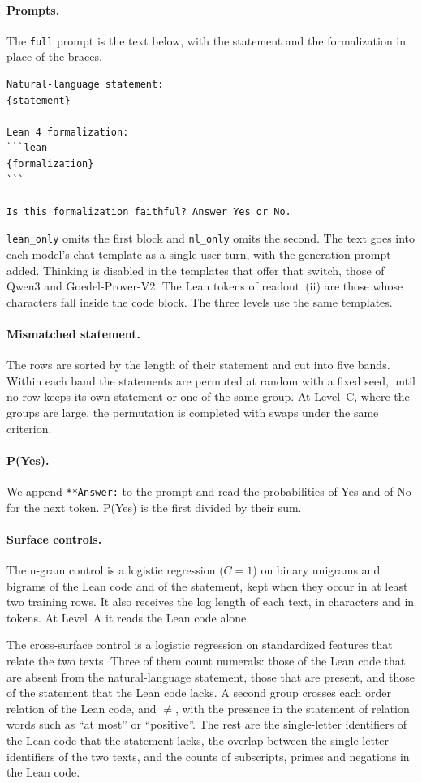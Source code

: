 \documentclass[10pt]{article}
\newcommand{\vr}[1]{\texttt{#1}}
\begin{document}
\paragraph{Prompts.} The \vr{full} prompt is the text below, with the statement and the formalization in place of the
braces.
\begin{verbatim}
Natural-language statement:
{statement}

Lean 4 formalization:
```lean
{formalization}
```

Is this formalization faithful? Answer Yes or No.
\end{verbatim}
\vr{lean\_only} omits the first block and \vr{nl\_only} omits the second. The text goes into each model's chat
template as a single user turn, with the generation prompt added. Thinking is disabled in the templates that offer
that switch, those of Qwen3 and Goedel-Prover-V2. The Lean tokens of readout~(ii) are those whose characters fall
inside the code block. The three levels use the same templates.

\paragraph{Mismatched statement.} The rows are sorted by the length of their statement and cut into five bands. Within
each band the statements are permuted at random with a fixed seed, until no row keeps its own statement or one of the
same group. At Level~C, where the groups are large, the permutation is completed with swaps under the same criterion.

\paragraph{P(Yes).} We append \vr{**Answer:} to the prompt and read the probabilities of Yes and of No for the next
token. P(Yes) is the first divided by their sum.

\paragraph{Surface controls.} The n-gram control is a logistic regression ($C = 1$) on binary unigrams and bigrams of
the Lean code and of the statement, kept when they occur in at least two training rows. It also receives the log length of
each text, in characters and in tokens. At Level~A it reads the Lean code alone.

The cross-surface control is a logistic regression on standardized features that relate the two texts. Three of them
count numerals: those of the Lean code that are absent from the natural-language statement, those that are
present, and those of the statement that the Lean code lacks. A second group crosses each order relation of the Lean code, and
$\neq$, with the presence in the statement of relation words such as ``at most'' or ``positive''. The rest are the
single-letter identifiers of the Lean code that the statement lacks, the overlap between the single-letter identifiers of
the two texts, and the counts of subscripts, primes and negations in the Lean code.
\end{document}
